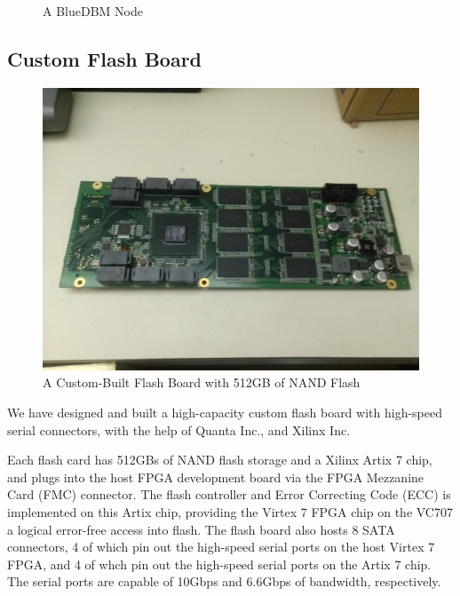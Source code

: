 \begin{figure}[ht]
	\begin{center}
	\caption{A BlueDBM Node}
	\label{fig:bluedbmnode}
	\end{center}
\end{figure}

\subsection{Custom Flash Board}

\begin{figure}[ht]
	\begin{center}
	\includegraphics[width=0.4\paperwidth]{figures/flashboard.jpg}
	\caption{A Custom-Built Flash Board with 512GB of NAND Flash}
	\label{fig:flashboard}
	\end{center}
\end{figure}

We have designed and built a high-capacity custom flash board with high-speed
serial connectors, with the help of Quanta Inc., and Xilinx Inc.

Each flash card has 512GBs of NAND flash storage and a Xilinx Artix 7 chip, and
plugs into the host FPGA development board via the FPGA Mezzanine Card (FMC)
connector. The flash controller and Error Correcting Code (ECC) is implemented
on this Artix chip, providing the Virtex 7 FPGA chip on the VC707 a logical
error-free access into flash. The flash board also hosts 8 SATA connectors, 4 of
which pin out the high-speed serial ports on the host Virtex 7 FPGA,
and 4 of whch pin out the high-speed serial ports on the Artix 7 chip.
The serial ports are capable of 10Gbps and 6.6Gbps of bandwidth, respectively.
